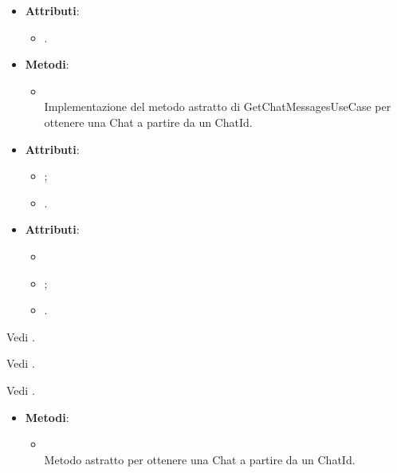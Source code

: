 \documentclass[10pt, a4paper]{article}
\begin{document}
\label{GetChatMessagesServiceDettaglio}
\begin{itemize}
    \item \textbf{Attributi}:
    \begin{itemize}
        \item {}.
    \end{itemize}
    \item \textbf{Metodi}:
    \begin{itemize}
        \item {}\\
        Implementazione del metodo astratto di GetChatMessagesUseCase per ottenere una Chat a partire da un ChatId.
    \end{itemize}
\end{itemize}

\label{ChatDettaglio}
\begin{itemize}
    \item \textbf{Attributi}:
    \begin{itemize}
        \item {};
        \item {}.
    \end{itemize}
\end{itemize}

\label{ChatInfoDettaglio}
\begin{itemize}
    \item \textbf{Attributi}:
    \begin{itemize}
        \item {}
        \item {};
        \item {}.
    \end{itemize}
\end{itemize}

Vedi .

Vedi .

Vedi .

\label{GetChatMessagesPortDettaglio}
\begin{itemize}
    \item \textbf{Metodi}:
    \begin{itemize}
        \item {}\\
        Metodo astratto per ottenere una Chat a partire da un ChatId.
    \end{itemize}
\end{itemize}
\end{document}
